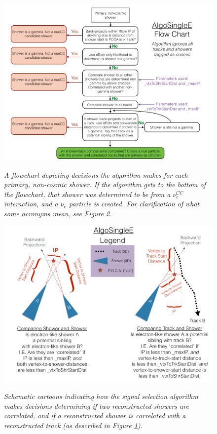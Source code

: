\begin{figure}[ht!]
\centering
\includegraphics[width=150mm]{Figures/algosinglee_flowchart.png}\\
\caption{\textit{A flowchart depicting decisions the algorithm makes for each primary, non-cosmic shower. If the algorithm gets to the bottom of the flowchart, that shower was determined to be from a $\nu_e^{CC}$ interaction, and a $\nu_e$ particle is created. For clarification of what some acronyms mean, see Figure \ref{algosinglee_cartoon_fig}.}}
\label{algosinglee_flowchart_fig}
\end{figure}

\begin{figure}[ht!]
\centering
\includegraphics[width=150mm]{Figures/algosinglee_cartoon.png}\\
\caption{\textit{Schematic cartoons indicating how the signal selection algorithm makes decisions determining if two reconstructed showers are correlated, and if a reconstructed shower is correlated with a reconstructed track (as described in Figure \ref{algosinglee_flowchart_fig}).}}
\label{algosinglee_cartoon_fig}
\end{figure}

